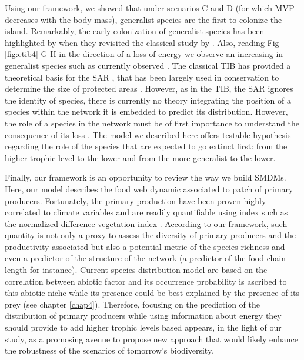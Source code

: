Using our framework, we showed that under scenarios C and D (for which
MVP decreases with the body mass), generalist species are the first to
colonize the island. Remarkably, the early colonization of generalist
species has been highlighted by \citet{Piechnik2008} when they revisited
the classical study by \citet{Simberloff1969}. Also, reading Fig
\ref{fig:etib4} G-H in the direction of a loss of energy we observe an
increasing in generalist species such as currently observed
\citet{Clavel2011}. The classical TIB has provided a theoretical basis
for the SAR \citep{MacArthur1967}, that has been largely used in
conservation to determine the size of protected areas
\citep{Neigel2003}. However, as in the TIB, the SAR ignores the identity
of species, there is currently no theory integrating the position of a
species within the network it is embedded to predict its distribution.
However, the role of a species in the network must be of first
importance to understand the consequence of its loss
\citep{Saterberg2013}. The model we described here offers testable
hypothesis regarding the role of the species that are expected to go
extinct first: from the higher trophic level to the lower and from the
more generalist to the lower.

Finally, our framework is an opportunity to review the way we build
SMDMs. Here, our model describes the food web dynamic associated to
patch of primary producers. Fortunately, the primary production have
been proven highly correlated to climate variables
\citep{Wright1983, Hawkins2003, Evans2005} and are readily quantifiable
using index such as the normalized difference vegetation index
\citep[NDVI][]{Evans2005}. According to our framework, such quantity is
not only a proxy to assess the diversity of primary producers and the
productivity associated but also a potential metric of the species
richness \citep{Wright1983} and even a predictor of the structure of the
network (a predictor of the food chain length for instance). Current
species distribution model are based on the correlation between abiotic
factor and its occurrence probability is ascribed to this abiotic niche
while its presence could be best explained by the presence of its prey
(see chapter \ref{chap4}). Therefore, focusing on the prediction of the
distribution of primary producers while using information about energy
they should provide to add higher trophic levels based appears, in the
light of our study, as a promosing avenue to propose new approach that
would likely enhance the robustness of the scenarios of tomorrow's
biodiversity.

